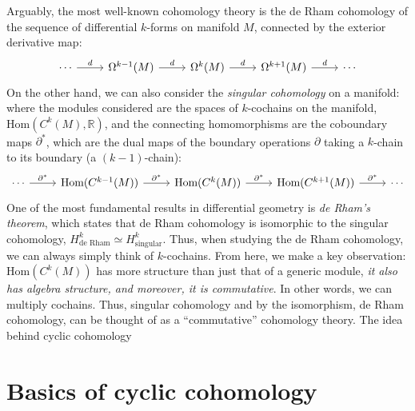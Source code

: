 \documentclass[aps,pra,showpacs,notitlepage,onecolumn,superscriptaddress,nofootinbib]{revtex4-1}
\theoremstyle{definition}
\begin{document}
Arguably, the most well-known cohomology theory is the de Rham cohomology of the sequence of differential $k$-forms on manifold $M$, connected by the exterior derivative map:
\[\begin{tikzcd}
\cdots & {\Omega^{k - 1}(M)} & {\Omega^{k}(M)} & {\Omega^{k + 1}(M)} & \cdots
\arrow["d", from=1-1, to=1-2]
\arrow["d", from=1-2, to=1-3]
\arrow["d", from=1-3, to=1-4]
\arrow["d", from=1-4, to=1-5]
\end{tikzcd}\]
On the other hand, we can also consider the \emph{singular cohomology} on a manifold: where the modules considered are the spaces of $k$-cochains on the manifold, $\text{Hom}(C^{k}(M), \mathbb{R})$, and
the connecting homomorphisms are the coboundary maps $\partial^{*}$, which are the dual maps of the boundary operations $\partial$ taking a $k$-chain to its boundary (a $(k - 1)$-chain):
\[\begin{tikzcd}
\cdots & {\text{Hom}(C^{k - 1}(M))} & {\text{Hom}(C^{k}(M))} & {\text{Hom}(C^{k + 1}(M))} & \cdots
\arrow["{\partial^{*}}", from=1-1, to=1-2]
\arrow["{\partial^{*}}", from=1-2, to=1-3]
\arrow["{\partial^{*}}", from=1-3, to=1-4]
\arrow["{\partial^{*}}", from=1-4, to=1-5]
\end{tikzcd}\]
One of the most fundamental
results in differential geometry is \emph{de Rham's theorem}, which states that de Rham cohomology is isomorphic to the singular cohomology, $H^{k}_{\text{de Rham}} \simeq H^{k}_{\text{singular}}$. Thus, when studying the de Rham cohomology, we can always simply
think of $k$-cochains. From here, we make a key observation: $\text{Hom}(C^{k}(M))$ has more structure than just that of a generic module, \emph{it also has algebra structure, and moreover, it is commutative}. In other words, we
can multiply cochains. Thus, singular cohomology and by the isomorphism, de Rham cohomology, can be thought of as a ``commutative'' cohomology theory. The idea behind cyclic cohomology 


\section{Basics of cyclic cohomology}
\end{document}
